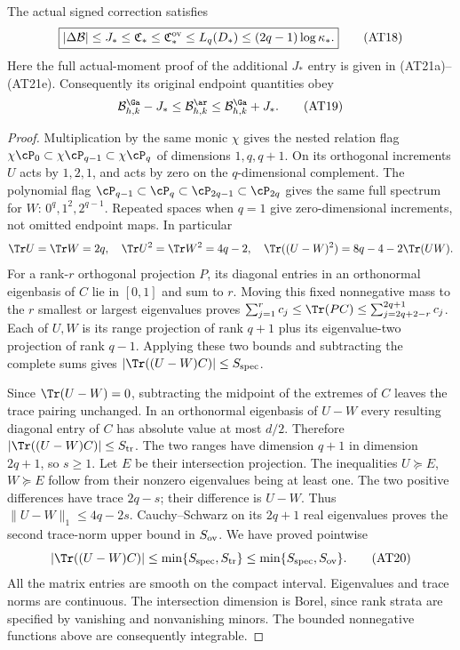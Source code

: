 \begin{theorem}
The actual signed correction satisfies
\[
\boxed{|\Delta\mathcal B|\le J_*\le\mathfrak C_*
 \le\mathfrak C_*^{\rm ov}\le L_q(D_*)
 \le(2q-1)\log\kappa_* .}\tag{AT18}
\]
Here the full actual-moment proof of the additional $J_*$ entry is
given in (AT21a)--(AT21e). Consequently its original endpoint quantities obey
\[
\mathcal B^\Ga_{h,k}-J_*
 \le\mathcal B^\ar_{h,k}
 \le\mathcal B^\Ga_{h,k}+J_* .\tag{AT19}
\]
\end{theorem}
\begin{proof}
Multiplication by the same monic $\chi$ gives the nested relation
flag $\chi\cP_0\subset\chi\cP_{q-1}\subset\chi\cP_q$ of
dimensions $1,q,q+1$. On its orthogonal increments $U$ acts by
$1,2,1$, and acts by zero on the $q$-dimensional complement.
The polynomial flag $\cP_{q-1}\subset\cP_q\subset\cP_{2q-1}
\subset\cP_{2q}$ gives the same full spectrum for $W$:
$0^q,1^2,2^{q-1}$. Repeated spaces when $q=1$ give zero-dimensional
increments, not omitted endpoint maps. In particular
\[
\Tr U=\Tr W=2q,\quad \Tr U^2=\Tr W^2=4q-2,
\quad\Tr((U-W)^2)=8q-4-2\Tr(UW).
\]
For a rank-$r$ orthogonal projection $P$, its diagonal entries in
an orthonormal eigenbasis of $C$ lie in $[0,1]$ and sum to $r$.
Moving this fixed nonnegative mass to the $r$ smallest or largest
eigenvalues proves
$\sum_{j=1}^r c_j\le\Tr(PC)\le\sum_{j=2q+2-r}^{2q+1}c_j$.
Each of $U,W$ is its range projection of rank $q+1$ plus its
eigenvalue-two projection of rank $q-1$. Applying these two bounds
and subtracting the complete sums gives $|\Tr((U-W)C)|\le S_{\rm spec}$.

Since $\Tr(U-W)=0$, subtracting the midpoint of the extremes of
$C$ leaves the trace pairing unchanged. In an orthonormal eigenbasis
of $U-W$ every resulting diagonal entry of $C$ has absolute value
at most $d/2$. Therefore $|\Tr((U-W)C)|\le S_{\rm tr}$.
The two ranges have dimension $q+1$ in dimension $2q+1$, so $s\ge1$.
Let $E$ be their intersection projection. The inequalities
$U\succeq E$, $W\succeq E$ follow from their nonzero eigenvalues
being at least one. The two positive differences have trace $2q-s$;
their difference is $U-W$. Thus $\|U-W\|_1\le4q-2s$.
Cauchy--Schwarz on its $2q+1$ real eigenvalues proves the second
trace-norm upper bound in $S_{\rm ov}$. We have proved pointwise
\[
|\Tr((U-W)C)|\le\min\{S_{\rm spec},S_{\rm tr}\}
 \le\min\{S_{\rm spec},S_{\rm ov}\}.\tag{AT20}
\]
All the matrix entries are smooth on the compact interval. Eigenvalues
and trace norms are continuous. The intersection dimension is Borel,
since rank strata are specified by vanishing and nonvanishing minors.
The bounded nonnegative functions above are consequently integrable.


\end{proof}
